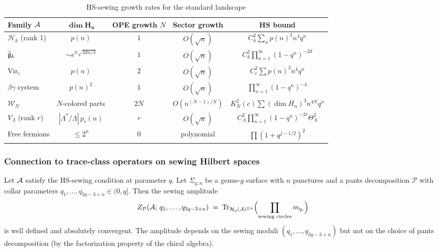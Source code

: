 \begin{table}[ht]
\centering
\caption{HS-sewing growth rates for the standard landscape}
\renewcommand{\arraystretch}{1.4}
{\footnotesize
\begin{tabular}{|l|c|c|c|c|}
\hline
\textbf{Family $\mathcal{A}$} & $\boldsymbol{\dim H_n}$ & \textbf{OPE growth $N$} & \textbf{Sector growth} & \textbf{HS bound} \\
\hline
$\mathcal{H}_k$ (rank 1) & $p(n)$ & $1$ & $O(\sqrt{n})$ & $C_k^2\sum_n p(n)^3n^4q^n$ \\
\hline
$\widehat{\mathfrak{g}}_k$ & $\sim e^{\pi\sqrt{2dn/3}}$ & $1$ & $O(\sqrt{n})$ & $C_k^2\prod_{n=1}^\infty (1-q^n)^{-2d}$ \\
\hline
$\mathrm{Vir}_c$ & $p(n)$ & $2$ & $O(\sqrt{n})$ & $C_c^2\sum p(n)^3 n^4 q^n$ \\
\hline
$\beta\gamma$ system & $p(n)^2$ & $1$ & $O(\sqrt{n})$ & $\prod_{n=1}^\infty (1-q^n)^{-4}$ \\
\hline
$\mathcal{W}_N$ & $N$-colored parts & $2N$ & $O(n^{(N-1)/N})$ & $K_N^2(c)\sum (\dim H_n)^3 n^{4N} q^n$ \\
\hline
$V_\Lambda$ (rank $r$) & $|\Lambda^*/\Lambda|\,p_r(n)$ & $r$ & $O(\sqrt{n})$ & $C_\Lambda^2\prod_{n=1}^\infty (1-q^n)^{-2r}\Theta_\Lambda^2$ \\
\hline
Free fermions & $\leq 2^n$ & $0$ & polynomial & $\prod (1+q^{j-1/2})^2$ \\
\hline
\end{tabular}}
\end{table}

\subsubsection{Connection to trace-class operators on sewing Hilbert spaces}

\begin{proposition}
Let\/ $\mathcal{A}$ satisfy the HS-sewing condition at parameter $q$. Let $\Sigma_{g,n}$ be a genus-$g$ surface with $n$ punctures and a pants decomposition $\mathcal{P}$ with collar parameters $q_1, \ldots, q_{3g-3+n} \in (0,q]$. Then the sewing amplitude
\begin{equation}%
Z_{\mathcal{P}}(\cA;\, q_1, \ldots, q_{3g-3+n}) \;=\; \Tr_{\mathcal{H}_q(\cA)^{\otimes n}} \Bigl( \prod_{\text{sewing circles}} m_{q_i} \Bigr)
\end{equation}
is well defined and absolutely convergent. The amplitude depends on the sewing moduli $(q_1, \ldots, q_{3g-3+n})$ but not on the choice of pants decomposition (by the factorization property of the chiral algebra).
\end{proposition}

